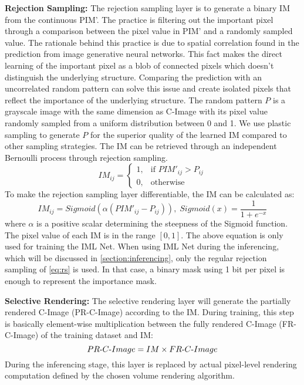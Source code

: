 \textbf{Rejection Sampling:}
The rejection sampling layer is to generate a binary IM from the continuous PIM'. The practice is filtering out the important pixel through a comparison between the pixel value in PIM' and a randomly sampled value. The rationale behind this practice is due to spatial correlation found in the prediction from image generative neural networks. This fact makes the direct learning of the important pixel as a blob of connected pixels which doesn't distinguish the underlying structure. Comparing the prediction with an uncorrelated random pattern can solve this issue and create isolated pixels that reflect the importance of the underlying structure. The random pattern $P$ is a grayscale image with the same dimension as C-Image with its pixel value randomly sampled from a uniform distribution between 0 and 1. We use plastic sampling to generate $P$ for the superior quality of the learned IM compared to other sampling strategies\cite{9264699}. The IM can be retrieved through an independent Bernoulli process through rejection sampling.
\begin{equation}\label{eq:rs}
    IM_{ij}= 
\begin{cases}
    1,& \text{if } PIM'_{ij} > P_{ij}\\
    0,              & \text{otherwise}
\end{cases}
\end{equation}
To make the rejection sampling layer differentiable, the IM can be calculated as:
\begin{equation}
IM_{ij} = Sigmoid(\alpha(PIM'_{ij} - P_{ij})),\;Sigmoid(x)=\frac{1}{1+e^{-x}}
\end{equation}
where $\alpha$ is a positive scalar determining the steepness of the Sigmoid function. The pixel value of each IM is in the range $[0, 1]$. The above equation is only used for training the IML Net. When using IML Net during the inferencing, which will be discussed in \cref{section:inferencing}, only the regular rejection sampling of \cref{eq:rs} is used. In that case, a binary mask using 1 bit per pixel is enough to represent the importance mask.

\textbf{Selective Rendering:}
The selective rendering layer will generate the partially rendered C-Image (PR-C-Image) according to the IM. During training, this step is basically element-wise multiplication between the fully rendered C-Image (FR-C-Image) of the training dataset and IM:
\begin{equation}
PR{\text -}C{\text -}Image = IM\times FR{\text -}C{\text -}Image
\end{equation}
During the inferencing stage, this layer is replaced by actual pixel-level rendering computation defined by the chosen volume rendering algorithm.



